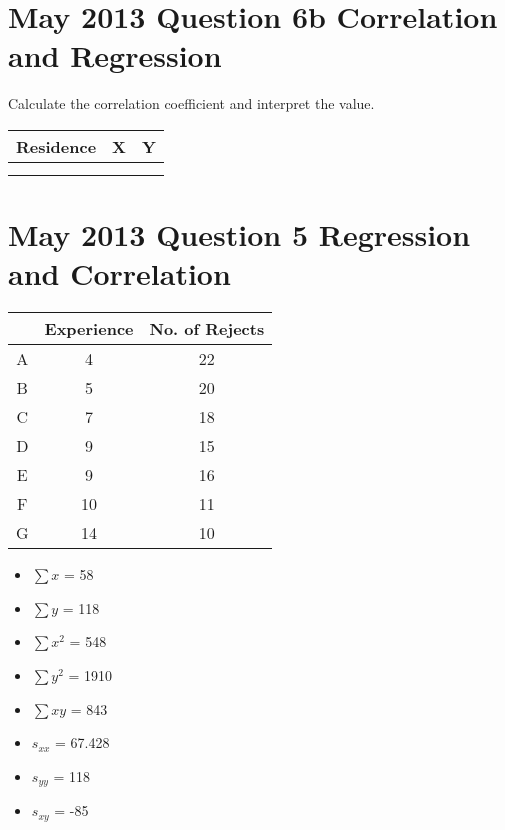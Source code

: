 \documentclass[]{report}
\begin{document}

	
\section*{May 2013 Question 6b Correlation and Regression }
Calculate the correlation coefficient and interpret the value.
\begin{tabular}{|c|c|c|}
	\hline Residence	& X	  & Y \\ 
	\hline  &  &  \\ 
	\hline  &  &  \\ 
	\hline 
\end{tabular} 



\section*{May 2013 Question 5 Regression and Correlation}
\begin{center}
	\begin{tabular}{|c|c|c|}
		\hline  & Experience & No. of Rejects \\ 
		\hline A & 4 & 22 \\ 
		\hline B & 5 & 20 \\ 
		\hline C & 7 & 18 \\ 
		\hline D & 9 & 15 \\ 
		\hline E & 9 & 16 \\ 
		\hline F & 10 & 11 \\ 
		\hline G & 14 & 10 \\ 
		\hline 
	\end{tabular} 
\end{center}

\begin{itemize}
	\item $\sum x$ = 58
	\item $\sum y$ = 118
	\item $\sum x^2$ = 548
	\item $\sum y^2$ = 1910
	\item $\sum xy$ = 843
\end{itemize}

\begin{itemize}
	\item $s_{xx}$ = 67.428
	\item $s_{yy}$ = 118
	\item $s_{xy}$ = -85
\end{itemize}
\end{document}
